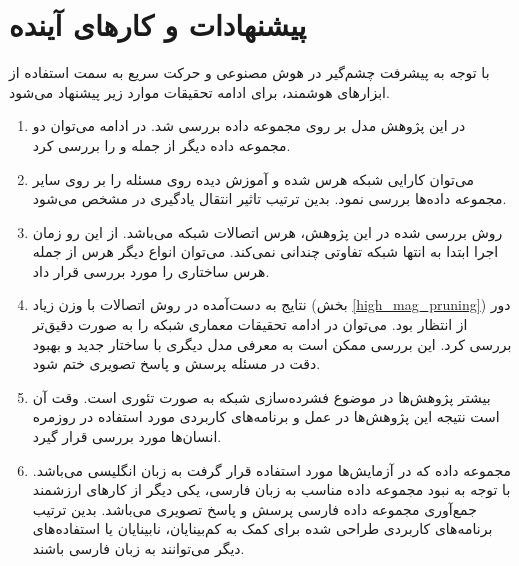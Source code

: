\section{پیشنهادات و کار‌های آینده}
با توجه به پیشرفت چشم‌گیر در هوش مصنوعی و حرکت سریع به سمت استفاده از ابزار‌های هوشمند، برای ادامه تحقیقات موارد زیر پیشنهاد می‌شود.
\begin{enumerate}
	\item در این پژوهش مدل
	بر روی مجموعه داده
	بررسی شد. در ادامه می‌توان دو مجموعه داده دیگر از جمله
	و 
	را بررسی کرد.
	\item
	می‌توان کارایی شبکه هرس شده و آموزش دیده روی مسئله 
	را بر روی سایر مجموعه داده‌ها
	 بررسی نمود. بدین ترتیب تاثیر انتقال یادگیری
	 در 
	مشخص می‌شود.
	\item روش بررسی شده در این پژوهش، هرس اتصالات شبکه می‌باشد. از این رو زمان اجرا ابتدا به انتها شبکه تفاوتی چندانی نمی‌کند. می‌توان انواع دیگر هرس از جمله هرس ساختاری
	را مورد بررسی قرار داد.
	\item
	نتایج به دست‌آمده در روش اتصالات با وزن زیاد (بخش \ref{high_mag_pruning}) دور از انتظار بود. می‌توان در ادامه تحقیقات معماری شبکه
	را به صورت دقیق‌تر بررسی کرد. این بررسی ممکن است به معرفی مدل دیگری با ساختار جدید و بهبود دقت در مسئله پرسش و پاسخ تصویری ختم شود.
	\item بیشتر پژوهش‌ها در موضوع فشرده‌سازی شبکه به صورت تئوری است. وقت آن است  نتیجه این پژوهش‌ها در عمل و برنامه‌های کاربردی
	 مورد استفاده در روزمره انسان‌ها مورد بررسی قرار گیرد. 
	
	\item مجموعه داده
	که در آزمایش‌ها مورد استفاده قرار گرفت به زبان انگلیسی می‌باشد. با توجه به نبود مجموعه داده مناسب به زبان فارسی، یکی دیگر از کار‌های ارزشمند جمع‌آوری مجموعه داده فارسی پرسش و پاسخ تصویری می‌باشد. بدین ترتیب برنامه‌های کاربردی طراحی شده برای کمک به کم‌بینایان، نابینایان یا استفاده‌های دیگر می‌توانند به زبان فارسی باشند.
\end{enumerate}



